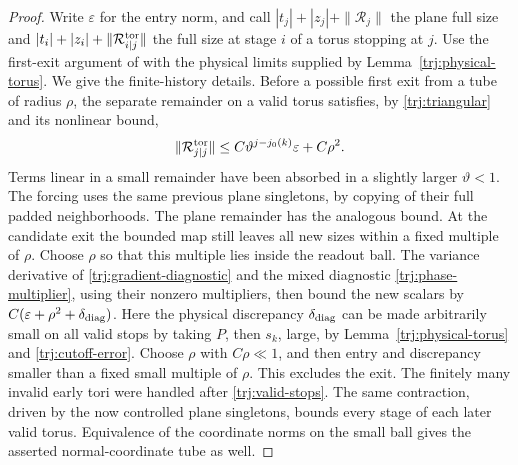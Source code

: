 \begin{proof}
Write \(\varepsilon\) for the entry norm, and call
\(|t_j|+|z_j|+\|\mathcal R_j\|\) the plane full size and
\(|t_i|+|z_i|+\|\mathcal R_{i|j}^{\rm tor}\|\) the full size at stage
\(i\) of a torus stopping at \(j\).  Use the first-exit argument of
\cite[Proposition~10.2]{B} with the
physical limits supplied by Lemma~\ref{trj:physical-torus}.  We give
the finite-history details.  Before a possible first exit from a tube
of radius \(\rho\), the separate remainder on a valid torus satisfies,
by \eqref{trj:triangular} and its nonlinear bound,
\[
 \|\mathcal R_{j|j}^{\rm tor}\|
       \le C\vartheta^{j-j_0(k)}\varepsilon+C\rho^2.
\]
Terms linear in a small remainder have been absorbed in a slightly
larger \(\vartheta<1\).  The forcing uses the same previous plane
singletons, by copying of their full padded neighborhoods.  The plane
remainder has the analogous bound.  At the candidate exit the bounded
map still leaves all new sizes within a fixed multiple of \(\rho\).
Choose \(\rho\) so that this multiple lies inside the readout ball.
The variance derivative of \eqref{trj:gradient-diagnostic} and the
mixed diagnostic \eqref{trj:phase-multiplier}, using their nonzero
multipliers, then bound the new scalars by
\(C(\varepsilon+\rho^2+\delta_{\rm diag})\).  Here the physical
discrepancy \(\delta_{\rm diag}\) can be made arbitrarily small on
all valid stops by taking \(P\), then \(s_k\), large, by
Lemma~\ref{trj:physical-torus} and \eqref{trj:cutoff-error}.
Choose \(\rho\) with \(C\rho\ll1\), and then entry and discrepancy
smaller than a fixed small multiple of \(\rho\).  This excludes the
exit.  The finitely many invalid early tori were handled after
\eqref{trj:valid-stops}.  The same contraction, driven by the now
controlled plane singletons, bounds every stage of each later valid
torus.  Equivalence of the coordinate norms on
the small ball gives the asserted normal-coordinate tube as well.


\end{proof}
